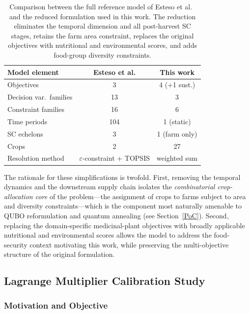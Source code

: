 \documentclass{oqireport}
\begin{document}
\begin{table}[ht]
\centering
\small
\begin{tabular}{lcc}
\toprule
\textbf{Model element} & \textbf{Esteso et al.} & \textbf{This work} \\
\midrule
Objectives             & 3  & 4 (+1 sust.) \\
Decision var.\ families & 13 & 3 \\
Constraint families    & 16 & 6 \\
Time periods           & 104 & 1 (static) \\
SC echelons            & 3  & 1 (farm only) \\
Crops                  & 2  & 27 \\
Resolution method      & $\varepsilon$-constraint + TOPSIS & weighted sum \\
\bottomrule
\end{tabular}
\caption{Comparison between the full reference model of Esteso et al.~\cite{esteso_sustainable_2023} and the reduced formulation used in this work. The reduction eliminates the temporal dimension and all post-harvest SC stages, retains the farm area constraint, replaces the original objectives with nutritional and environmental scores, and adds food-group diversity constraints.}
\label{tab:model_reduction}
\end{table}

The rationale for these simplifications is twofold. First, removing the temporal dynamics and the downstream supply chain isolates the \emph{combinatorial crop-allocation core} of the problem---the assignment of crops to farms subject to area and diversity constraints---which is the component most naturally amenable to QUBO reformulation and quantum annealing (see Section~\ref{PoC}). Second, replacing the domain-specific medicinal-plant objectives with broadly applicable nutritional and environmental scores allows the model to address the food-security context motivating this work, while preserving the multi-objective structure of the original formulation.


\subsection{Lagrange Multiplier Calibration Study}

\subsubsection{Motivation and Objective}
\end{document}
